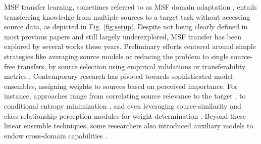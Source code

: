 \documentclass[letterpaper]{article} %
\begin{document}
MSF transfer learning, sometimes referred to as MSF domain adaptation \citep{han2023discriminability}, entails transferring knowledge from multiple sources to a target task without accessing source data, as depicted in Fig. \ref{fig:setup}.
Despite not being clearly defined in most previous papers and still largely underexplored, MSF transfer has been explored by several works these years. Preliminary efforts centered around simple strategies like averaging source models or reducing the problem to single source-free transfers, by source selection using empirical validations or transferability metrics \citep[e.g.][]{yang2023pick}. Contemporary research has pivoted towards sophisticated model ensembles, assigning weights to sources based on perceived importance. For instance, approaches range from correlating source relevance to the target \citep{lee2019learning}, to conditional entropy minimization \citep{ahmed2021unsupervised}, and even leveraging source-similarity and class-relationship perception modules for weight determination \citep{dong2021confident, han2023discriminability}. 
Beyond these linear ensemble techniques, some researchers also introduced auxiliary models to endow cross-domain capabilities \citep{li2022source}.
\end{document}
